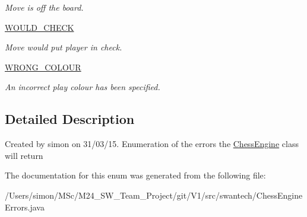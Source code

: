 \begin{DoxyCompactItemize}
\begin{DoxyCompactList}\small\item\em Move is off the board. \end{DoxyCompactList}\item 
\hypertarget{enumswantech_1_1_chess_engine_errors_a81e82842b33b2f3fc78c9872710f2a3a}{}\hyperlink{enumswantech_1_1_chess_engine_errors_a81e82842b33b2f3fc78c9872710f2a3a}{W\+O\+U\+L\+D\+\_\+\+C\+H\+E\+C\+K}\label{enumswantech_1_1_chess_engine_errors_a81e82842b33b2f3fc78c9872710f2a3a}

\begin{DoxyCompactList}\small\item\em Move would put player in check. \end{DoxyCompactList}\item 
\hypertarget{enumswantech_1_1_chess_engine_errors_a4c75ee89f5c8c4b661beb60f0a06f313}{}\hyperlink{enumswantech_1_1_chess_engine_errors_a4c75ee89f5c8c4b661beb60f0a06f313}{W\+R\+O\+N\+G\+\_\+\+C\+O\+L\+O\+U\+R}\label{enumswantech_1_1_chess_engine_errors_a4c75ee89f5c8c4b661beb60f0a06f313}

\begin{DoxyCompactList}\small\item\em An incorrect play colour has been specified. \end{DoxyCompactList}\end{DoxyCompactItemize}


\subsection{Detailed Description}
Created by simon on 31/03/15. Enumeration of the errors the \hyperlink{classswantech_1_1_chess_engine}{Chess\+Engine} class will return 

The documentation for this enum was generated from the following file\+:\begin{DoxyCompactItemize}
\item 
/\+Users/simon/\+M\+Sc/\+M24\+\_\+\+S\+W\+\_\+\+Team\+\_\+\+Project/git/\+V1/src/swantech/Chess\+Engine\+Errors.\+java\end{DoxyCompactItemize}
